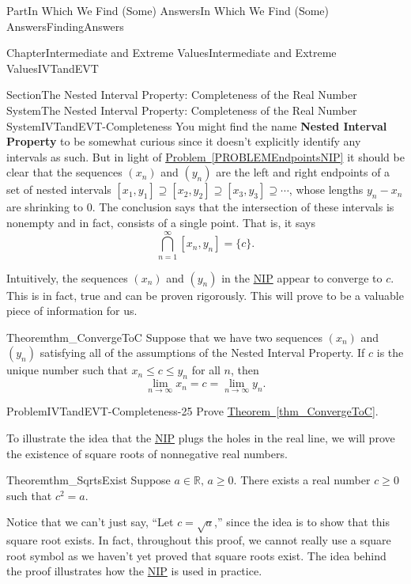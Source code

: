 \documentclass[oneside,10pt,]{book}
\newcommand{\xreffont}{\relax}
\newcommand{\terminology}[1]{\textbf{#1}}
\numberwithin{equation}{part}
\def\limit#1#2#3{{\displaystyle\lim_{#1\rightarrow #2}#3}}
\begin{document}
\begin{partptx}{Part}{In Which We Find (Some) Answers}{}{In Which We Find (Some) Answers}{}{}{FindingAnswers}
\begin{chapterptx}{Chapter}{Intermediate and Extreme Values}{}{Intermediate and Extreme Values}{}{}{IVTandEVT}
\begin{sectionptx}{Section}{The Nested Interval Property: Completeness of the Real Number System}{}{The Nested Interval Property: Completeness of the Real Number System}{}{}{IVTandEVT-Completeness}
You might find the name \terminology{Nested Interval Property} to be somewhat curious since it doesn't explicitly identify any intervals as such. But in light of \hyperref[PROBLEMEndpointsNIP]{Problem~{\xreffont\ref{PROBLEMEndpointsNIP}}} it should be clear that the sequences \((x_n)\) and \((y_n)\) are the left and right endpoints of a set of nested intervals \([x_1,y_1]\supseteq[x_2,y_2]\supseteq[x_3,y_3]\supseteq\cdots\), whose lengths \(y_n-x_n\) are shrinking to \(0\).  The conclusion says that the intersection of these intervals is non\textendash{}empty and in fact, consists of a single point.  That is, it says%
\begin{equation*}
\bigcap_{n=1}^\infty[x_n,y_n]=\{c\}\text{.}
\end{equation*}
%
\par
Intuitively, the sequences \(\left(x_n\right)\) and \(\left(y_n\right)\) in the \hyperref[NIP]{NIP} appear to converge to \(c\).  This is in fact, true and can be proven rigorously. This will prove to be a valuable piece of information for us.%
\begin{theorem}{Theorem}{}{}{thm_ConvergeToC}%
%
%
Suppose that we have two sequences \(\left(x_n\right)\) and \(\left(y_n\right)\) satisfying all of the assumptions of the Nested Interval Property.  If \(c\) is the unique number such that \(x_n\leq c\leq y_n\) for all \(n\), then%
\begin{equation*}
\limit{n}{\infty}{x_n}=c =
\limit{n}{\infty}{y_n}\text{.}
\end{equation*}
%
\end{theorem}
\begin{problem}{Problem}{}{IVTandEVT-Completeness-25}%
Prove \hyperref[thm_ConvergeToC]{Theorem~{\xreffont\ref{thm_ConvergeToC}}}.%
\end{problem}
To illustrate the idea that the \hyperref[NIP]{NIP}  plugs the holes in the real line, we will prove the existence of square roots of nonnegative real numbers.%
\begin{theorem}{Theorem}{}{}{thm_SqrtsExist}%
%
Suppose \(a\in\mathbb{R},\,a\geq 0\).  There exists a real number \(c\geq 0\) such that \(c^2=a\).%
\end{theorem}
Notice that we can't just say, ``Let \(c=\sqrt{a}\),'' since the idea is to show that this square root exists.  In fact, throughout this proof, we cannot really use a square root symbol as we haven't yet proved that square roots exist.  The idea behind the proof illustrates how the \hyperref[NIP]{NIP} is used in practice.%

\end{sectionptx}
\end{chapterptx}
\end{partptx}
\end{document}
